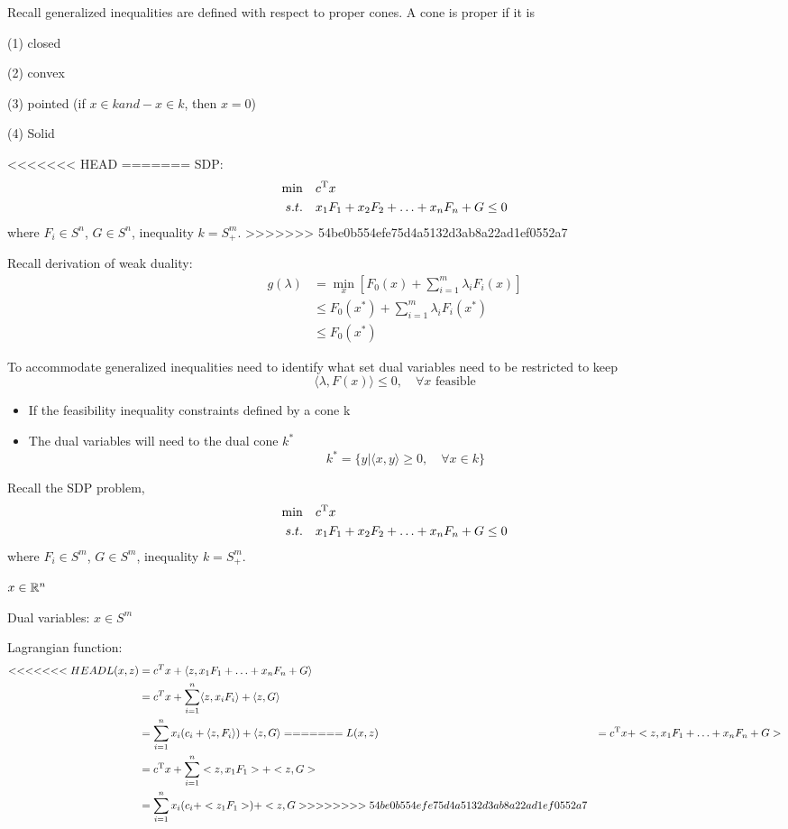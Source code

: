 Recall generalized inequalities are defined with respect to proper cones. A cone is proper if it is

	(1) closed
	
	(2) convex
	
	(3) pointed (if $x\in k and -x\in k$, then $x=0$)
	
	(4) Solid

<<<<<<< HEAD
=======
SDP:
\begin{align*}
\min\quad &c^{{\rm T}}x\\
s.t.\quad &x_1F_1+x_2F_2+\ldots+x_nF_n+G\leq 0
\end{align*}
where $F_i\in S^n$, $G\in S^n$, inequality $k=S^m_+$.
>>>>>>> 54be0b554efe75d4a5132d3ab8a22ad1ef0552a7




Recall derivation of weak duality:
\begin{align*}
g(\lambda) &= \min_x[F_0(x) + \sum^m_{i=1}\lambda_iF_i(x)]\\
&\leq F_0(x^*) + \sum^m_{i=1}\lambda_i F_i(x^*) \\
&\leq F_0(x^*)
\end{align*}

To accommodate generalized inequalities need to identify what set dual variables need to be restricted to keep
\begin{equation*}
\langle \lambda, F(x)\rangle\leq 0,\quad \forall x \text{ feasible}
\end{equation*}



\begin{itemize}
	\item If the feasibility inequality constraints defined by a cone k
	
	\item The dual variables will need to the dual cone $k^*$
$$k^*=\{y| \langle x,y\rangle \geq 0, \quad \forall x\in k \}$$
\end{itemize}



Recall the SDP problem,
\begin{align*}
\min\quad &c^{{\rm T}}x\\
s.t.\quad &x_1F_1+x_2F_2+\ldots+x_nF_n+G\leq 0
\end{align*}
where $F_i\in S^m$, $G\in S^m$, inequality $k=S^m_+$.


$x\in \mathbb{R}^n$

Dual variables: $x\in S^m$

Lagrangian function:
\begin{align*}
<<<<<<< HEAD
L(x,z) &= c^Tx + \langle z,x_1F_1+\ldots +x_nF_n+G\rangle \\
&= c^Tx + \sum^n_{i=1}\langle z,x_iF_i\rangle+\langle z,G\rangle\\
&= \sum^n_{i=1}x_i(c_i+\langle z, F_i\rangle)+\langle z,G\rangle
=======
L(x,z) &= c^{{\rm T}}x + <z,x_1F_1+\ldots +x_nF_n+G>\\
&= c^{{\rm T}}x + \sum^n_{i=1}<z,x_1F_1>+<z,G>\\
&= \sum^n_{i=1}x_i(c_i+<z_1F_1>)+<z,G>
>>>>>>> 54be0b554efe75d4a5132d3ab8a22ad1ef0552a7
\end{align*}

